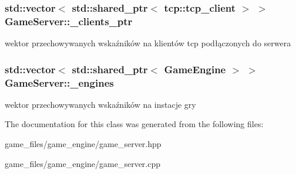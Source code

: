 \subsubsection[{\texorpdfstring{\+\_\+clients\+\_\+ptr}{_clients_ptr}}]{\setlength{\rightskip}{0pt plus 5cm}std\+::vector$<$ std\+::shared\+\_\+ptr$<$ tcp\+::tcp\+\_\+client $>$ $>$ Game\+Server\+::\+\_\+clients\+\_\+ptr\hspace{0.3cm}{\ttfamily [static]}}\hypertarget{classGameServer_abaa2e87ca0e4112c317a5d74d7f68be2}{}\label{classGameServer_abaa2e87ca0e4112c317a5d74d7f68be2}
wektor przechowywanych wskaźników na klientów tcp podłączonych do serwera 
\subsubsection[{\texorpdfstring{\+\_\+engines}{_engines}}]{\setlength{\rightskip}{0pt plus 5cm}std\+::vector$<$ std\+::shared\+\_\+ptr$<$ {\bf Game\+Engine} $>$ $>$ Game\+Server\+::\+\_\+engines\hspace{0.3cm}{\ttfamily [static]}}\hypertarget{classGameServer_a39f72d0082d78d1327b8c34b19c4aa66}{}\label{classGameServer_a39f72d0082d78d1327b8c34b19c4aa66}
wektor przechowywanych wskaźników na instacje gry 

The documentation for this class was generated from the following files\+:\begin{DoxyCompactItemize}
\item 
game\+\_\+files/game\+\_\+engine/game\+\_\+server.\+hpp\item 
game\+\_\+files/game\+\_\+engine/game\+\_\+server.\+cpp\end{DoxyCompactItemize}
